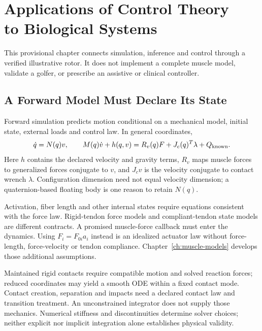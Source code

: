 \chapter[Control Theory in Biological Systems]{Applications of Control Theory\\to Biological Systems}
\label{ch:control-bio}
\begin{gomdraftnotice}
This provisional chapter connects simulation, inference and control through a
verified illustrative rotor. It does not implement a complete muscle model,
validate a golfer, or prescribe an assistive or clinical controller.
\end{gomdraftnotice}

\section{A Forward Model Must Declare Its State}
Forward simulation predicts motion conditional on a mechanical model, initial state,
external loads and control law. In general coordinates,
\begin{equation}
 \dot q=N(q)v,\qquad
 M(q)\dot v+h(q,v)=R_v(q)F+J_c(q)^T\lambda+Q_{\rm known}.
 \label{eq:ch10:forward-dynamics}
\end{equation}
Here $h$ contains the declared velocity and gravity terms, $R_v$ maps muscle forces
to generalized forces conjugate to $v$, and $J_cv$ is the velocity conjugate to
contact wrench $\lambda$. Configuration dimension need not equal velocity dimension;
a quaternion-based floating body is one reason to retain $N(q)$.

Activation, fiber length and other internal states require equations consistent with
the force law. Rigid-tendon force models and compliant-tendon state models are
different contracts. A promised muscle-force callback must enter the dynamics.
Using $F_i=F_{0i}a_i$ instead is an idealized actuator law without force-length,
force-velocity or tendon compliance. Chapter~\ref{ch:muscle-models} develops those
additional assumptions.

Maintained rigid contacts require compatible motion and solved reaction forces;
reduced coordinates may yield a smooth ODE within a fixed contact mode. Contact
creation, separation and impacts need a declared contact law and transition treatment.
An unconstrained integrator does not supply those mechanics. Numerical stiffness
and discontinuities determine solver choices; neither explicit nor implicit
integration alone establishes physical validity.

